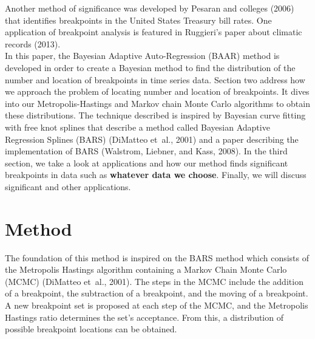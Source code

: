 \documentclass[submit]{smj}
\begin{document}
Another method of significance was developed by Pesaran and colleges (2006) that identifies breakpoints in the United States Treasury bill rates.  
One application of breakpoint analysis is featured in Ruggieri’s paper about climatic records (2013). 
\\
In this paper, the Bayesian Adaptive Auto-Regression (BAAR) method is developed in order to create a Bayesian method to find the distribution of the number and location of breakpoints in time series data.  Section two address how we approach the problem of locating number and location of breakpoints.  It dives into our Metropolis-Hastings and Markov chain Monte Carlo algorithms to obtain these distributions. The technique described is inspired by Bayesian curve fitting with free knot splines that describe a method called Bayesian Adaptive Regression Splines (BARS)  (DiMatteo et~al., 2001) and a paper describing the implementation of BARS (Walstrom, Liebner, and Kass, 2008). In the third section, we take a look at applications and how our method finds significant breakpoints in data such as \textbf{whatever data we choose}. Finally, we will discuss significant and other applications. 


\section{Method}
The foundation of this method is inspired on the BARS method which consists of the Metropolis Hastings algorithm containing a Markov Chain Monte Carlo (MCMC) (DiMatteo et~al., 2001). The steps in the MCMC include the addition of a breakpoint, the subtraction of a breakpoint, and the moving of a breakpoint. A new breakpoint set is proposed at each step of the MCMC, and the Metropolis Hastings ratio determines the set's acceptance. From this, a distribution of possible breakpoint locations can be obtained. 
\end{document}
